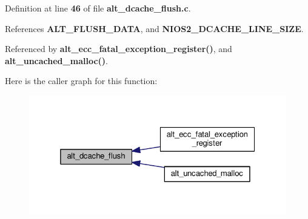Definition at line {\bf 46} of file {\bf alt\+\_\+dcache\+\_\+flush.\+c}.



References {\bf A\+L\+T\+\_\+\+F\+L\+U\+S\+H\+\_\+\+D\+A\+TA}, and {\bf N\+I\+O\+S2\+\_\+\+D\+C\+A\+C\+H\+E\+\_\+\+L\+I\+N\+E\+\_\+\+S\+I\+ZE}.



Referenced by {\bf alt\+\_\+ecc\+\_\+fatal\+\_\+exception\+\_\+register()}, and {\bf alt\+\_\+uncached\+\_\+malloc()}.



Here is the caller graph for this function\+:
\nopagebreak
\begin{figure}[H]
\begin{center}
\leavevmode
\includegraphics[width=325pt]{d6/db7/alt__dcache__flush_8c_a9fabe1416281a97e1767ada9f7c0a337_icgraph}
\end{center}
\end{figure}


